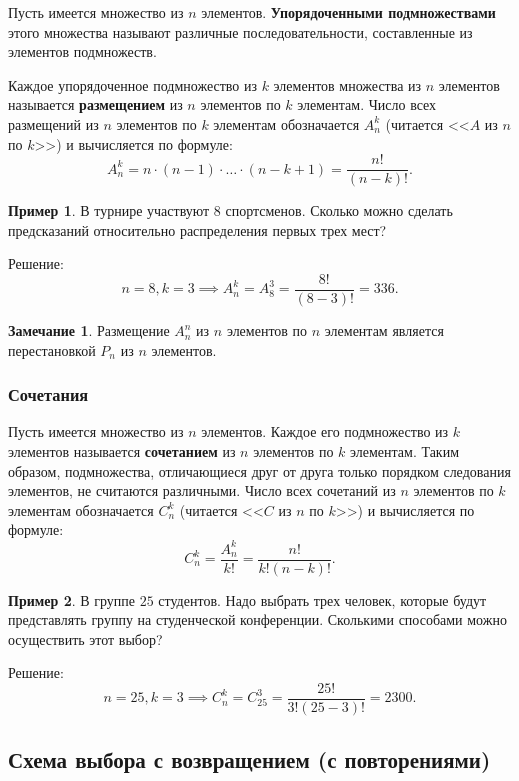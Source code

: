 \documentclass[a5paper, 11pt]{extarticle}
\theoremstyle{definition}
\newtheorem*{example*}{Пример}
\theoremstyle{definition}
\theoremstyle{definition}
\newtheorem*{note*}{Замечание}
\numberwithin{figure}{section}
\numberwithin{table}{section}
\begin{document}
Пусть имеется множество из \(n\) элементов. \textbf{Упорядоченными подмножествами} этого множества называют различные последовательности, составленные из элементов подмножеств.

Каждое упорядоченное подмножество из \(k\) элементов множества из \(n\) элементов называется \textbf{размещением} из \(n\) элементов по \(k\) элементам. Число всех размещений из \(n\) элементов по \(k\) элементам обозначается \(A_n^k\) (читается <<\(A\) из \(n\) по \(k\)>>) и вычисляется по формуле:
\[
    A_n^k = n \cdot (n - 1) \cdot \ldots \cdot (n - k + 1) = \frac{n!}{(n - k)!}.
\]

\begin{example*}
    В турнире участвуют \(8\) спортсменов. Сколько можно сделать предсказаний относительно распределения первых трех мест?

    Решение:
    \[
        n = 8, k = 3
        \implies
        A_n^k = A_8^3 =
        \frac{8!}{(8 - 3)!} = 336.
    \]
\end{example*}

\begin{note*}
    Размещение \(A_n^n\) из \(n\) элементов по \(n\) элементам является перестановкой \(P_n\) из \(n\) элементов.
\end{note*}

\subsubsection{Сочетания}

Пусть имеется множество из \(n\) элементов. Каждое его подмножество из \(k\) элементов называется \textbf{сочетанием} из \(n\) элементов по \(k\) элементам. Таким образом, подмножества, отличающиеся друг от друга только порядком следования элементов, не считаются различными. Число всех сочетаний из \(n\) элементов по \(k\) элементам обозначается \(C_n^k\) (читается <<\(C\) из \(n\) по \(k\)>>) и вычисляется по формуле:
\[
    C_n^k = \frac{A_n^k}{k!} = \frac{n!}{k! (n - k)!}.
\]

\begin{example*}
    В группе \(25\) студентов. Надо выбрать трех человек, которые будут представлять группу на студенческой конференции. Сколькими способами можно осуществить этот выбор?

    Решение:
    \[
        n = 25, k = 3
        \implies
        C_n^k = C_{25}^3 = \frac{25!}{3! (25 - 3)!} = 2300.
    \]
\end{example*}

\subsection{Схема выбора с возвращением (с повторениями)}
\end{document}

